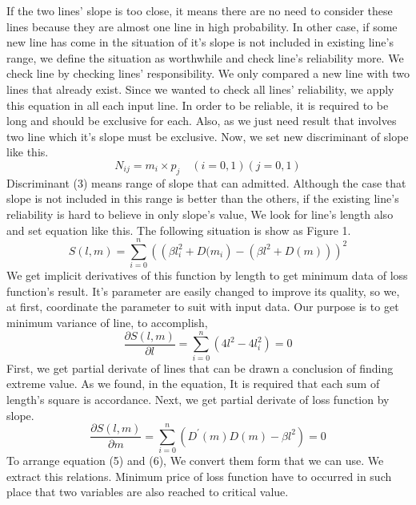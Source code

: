 {\newline If the two lines’ slope is too close, it means there are no need to consider these lines because they are almost one line in high probability. In other case, if some new line has come in the situation of it's slope is not included in existing line's range, we define the situation as worthwhile and check line's reliability more. We check line by checking lines’ responsibility. We only compared a new line with two lines that already exist. Since we wanted to check all lines’ reliability, we apply this equation in all each input line. \newline
In order to be reliable, it is required to be long and should be exclusive for each. Also, as we just need result that involves two line which it's slope must be exclusive. Now, we set new discriminant of slope like this. 
\begin{equation}
{N}_{ij} = {m}_{i} \times {p}_{j} \quad (i=0,1)(j=0,1)
\end{equation}
Discriminant (3) means range of slope that can admitted. Although the case that slope is not included in this range is better than the others, if the existing line's reliability is hard to believe in only slope's value, We look for line's length also and set equation like this. The following situation is show as Figure 1. 
\begin{equation}
\mathit{S\left(l,m\right) = \sum_{i=0}^{n}{(\left(\beta{l}_{i}^{2} + D({m}_{i}\right) - (\beta{l}^{2} + D\left(m \right)))}^{2}}
\end{equation}
We get implicit derivatives of this function by length to get minimum data of loss function's result. It's parameter are easily changed to improve its quality, so we, at first, coordinate the parameter to suit with input data. Our purpose is to get minimum variance of line, to accomplish,  
\begin{equation}
\mathit{\frac{\partial S\left(l,m\right)}{\partial l} = \sum_{i=0}^{n}{\left(4{l}^{2}-4{{l}_{i}^{2}}\right)} = 0} 
\end{equation}
First, we get partial derivate of lines that can be drawn a conclusion of finding extreme value. As we found, in the equation, It is required that each sum of length's square is accordance. Next, we get partial derivate of loss function by slope.
\begin{equation}
\mathit{\frac{\partial S\left(l,m\right)}{\partial m} = \sum_{i=0}^{n}{({D}^{\prime}(m)D(m) - \beta{l}^{2})} = 0}
\end{equation}
To arrange equation (5) and (6), We convert them form that we can use. We extract this relations. Minimum price of loss function have to occurred in such place that two variables are also reached to critical value.
}
